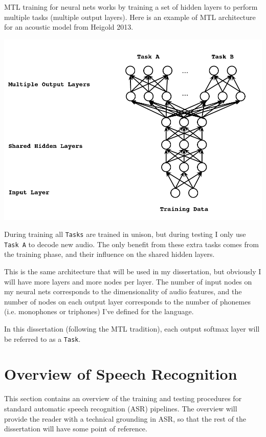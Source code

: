 \documentclass[10pt,a4paper]{article}
\begin{document}
MTL training for neural nets works by training a set of hidden layers to perform multiple tasks (multiple output layers). Here is an example of MTL architecture for an acoustic model from Heigold 2013.

\begin{center}
\includegraphics[width=.85\textwidth,keepaspectratio]{figs/heigold-2013-dnn-c.png}
\end{center}

During training all \texttt{Tasks} are trained in unison, but during testing I only use \texttt{Task A} to decode new audio. The only benefit from these extra tasks comes from the training phase, and their influence on the shared hidden layers.

This is the same architecture that will be used in my dissertation, but obviously I will have more layers and more nodes per layer. The number of input nodes on my neural nets corresponds to the dimensionality of audio features, and the number of nodes on each output layer corresponds to the number of phonemes (i.e. monophones or triphones) I've defined for the language.

In this dissertation (following the MTL tradition), each output softmax layer will be referred to as a \texttt{Task}.


\section{Overview of Speech Recognition}

This section contains an overview of the training and testing procedures for standard automatic speech recognition (ASR) pipelines. The overview will provide the reader with a technical grounding in ASR, so that the rest of the dissertation will have some point of reference. 
\end{document}
